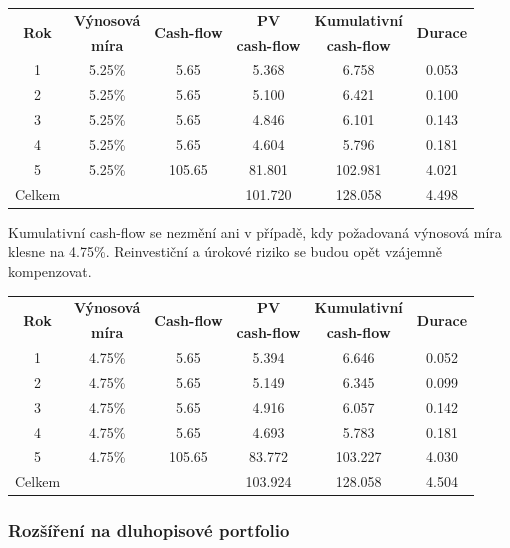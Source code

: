 \documentclass[a4paper]{book}
\begin{document}
\begin{center}
\begin{tabular}{c c c c c c}
\multirow{2}{*}{\textbf{Rok}} &  \textbf{Výnosová} & \multirow{2}{*}{\textbf{Cash-flow}} & \textbf{PV} & \textbf{Kumulativní} & \multirow{2}{*}{\textbf{Durace}}\\
 & \textbf{míra} & & \textbf{cash-flow} & \textbf{cash-flow} & \\
\hline
1 & 5.25\% &   5.65 &   5.368 &   6.758 & 0.053\\
2 & 5.25\% &   5.65 &   5.100 &   6.421 & 0.100\\
3 & 5.25\% &   5.65 &   4.846 &   6.101 & 0.143\\
4 & 5.25\% &   5.65 &   4.604 &   5.796 & 0.181\\
5 & 5.25\% & 105.65 &  81.801 & 102.981 & 4.021\\				
Celkem  & & & 101.720 & 128.058 & 4.498\\
\end{tabular}
\end{center}
Kumulativní cash-flow se nezmění ani v případě, kdy požadovaná výnosová míra klesne na 4.75\%. Reinvestiční a úrokové riziko se budou opět vzájemně kompenzovat.
\begin{center}
\begin{tabular}{c c c c c c}
\multirow{2}{*}{\textbf{Rok}} &  \textbf{Výnosová} & \multirow{2}{*}{\textbf{Cash-flow}} & \textbf{PV} & \textbf{Kumulativní} & \multirow{2}{*}{\textbf{Durace}}\\
 & \textbf{míra} & & \textbf{cash-flow} & \textbf{cash-flow} & \\
\hline
1 & 4.75\% &   5.65 &   5.394 &   6.646 & 0.052\\
2 & 4.75\% &   5.65 &   5.149 &   6.345 & 0.099\\
3 & 4.75\% &   5.65 &   4.916 &   6.057 & 0.142\\
4 & 4.75\% &   5.65 &   4.693 &   5.783 & 0.181\\
5 & 4.75\% & 105.65 &  83.772 & 103.227 & 4.030\\				
Celkem  & & & 103.924 & 128.058 & 4.504\\
\end{tabular}
\end{center}

\subsubsection{Rozšíření na dluhopisové portfolio}
\end{document}
